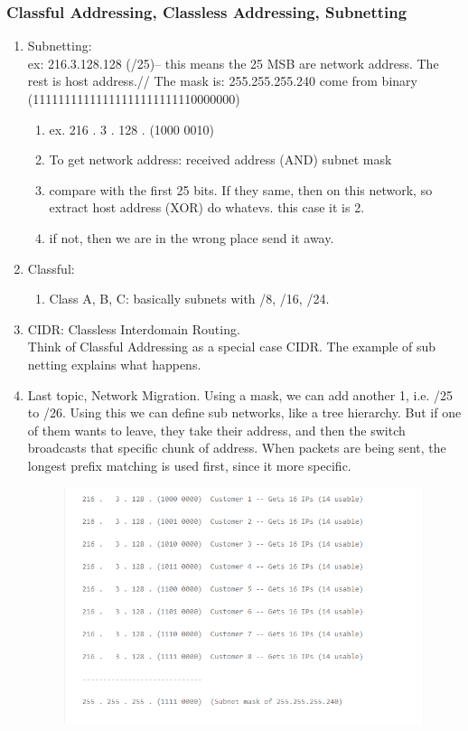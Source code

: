 \documentclass[11pt, a4paper]{article}
\begin{document}
\subsubsection{Classful Addressing, Classless Addressing, Subnetting}
\begin{enumerate}
    \item Subnetting: \\
    ex: 216.3.128.128 (/25)-- this means the 25 MSB are network address. The rest is host address.//
    The mask is: 255.255.255.240 come from binary (11111111111111111111111110000000)
    \begin{enumerate}
        \item ex. 216 .   3 . 128 . (1000 0010)
        \item To get network address: received address (AND) subnet mask
        \item compare with the first 25 bits. If they same, then on this network, so extract host address (XOR) do whatevs. this case it is 2.
        \item if not, then we are in the wrong place send it away.
    \end{enumerate}
    \item Classful:
    \begin{enumerate}
        \item Class A, B, C: basically subnets with /8, /16, /24.
    \end{enumerate}
    \item CIDR: Classless Interdomain Routing.\\
    Think of Classful Addressing as a special case CIDR.
    The example of sub netting explains what happens.
    \item Last topic, Network Migration.
    Using a mask, we can add another 1, i.e. /25 to /26. Using this we can define sub networks, like a tree hierarchy. But if one of them wants to leave, they take their address, and then the switch broadcasts that specific chunk of address. When packets are being sent, the longest prefix matching is used first, since it more specific.
    \begin{figure}[H]
        \centering
        \includegraphics[width = \textwidth]{Pictures/Subnet.png}

\end{figure}
\end{enumerate}
\end{document}
